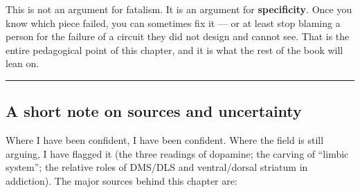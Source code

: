 This is not an argument for fatalism. It is an argument for \textbf{specificity}. Once you know which piece failed, you can sometimes fix it --- or at least stop blaming a person for the failure of a circuit they did not design and cannot see. That is the entire pedagogical point of this chapter, and it is what the rest of the book will lean on.

\begin{center}\rule{0.5\linewidth}{0.5pt}\end{center}

\subsection{A short note on sources and uncertainty}\label{06_neurology_101-a-short-note-on-sources-and-uncertainty}

Where I have been confident, I have been confident. Where the field is still arguing, I have flagged it (the three readings of dopamine; the carving of ``limbic system''; the relative roles of DMS/DLS and ventral/dorsal striatum in addiction). The major sources behind this chapter are:

